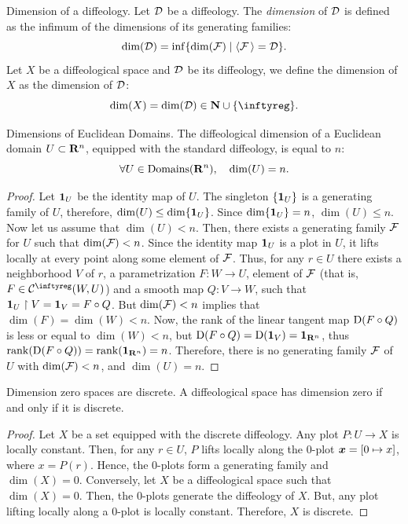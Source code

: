 \begin{Article}{Dimension of a diffeology.}{}
  Let $\mathcal{D}$ be a diffeology.
  The \emph{dimension} of $\mathcal{D}$ is defined as the infimum of the dimensions of its generating families:
  $$%
    \dim(\cD) = \inf \{ \dim(\cF) \mid  \langle \cF \,\rangle = \cD \}.
    $$%
  Let $X$ be a diffeological space and $\mathcal{D}$ be its diffeology,
  we define the dimension of $X$ as the dimension of $\mathcal{D}$:
  $$%
    \dim(X) = \dim(\cD) \in \NN \cup \{\infty\}.
    $$%
\end{Article}

\begin{Article}{Dimensions of Euclidean Domains.}{}
  \label{Dimensions-of-numerical-domains}
  The diffeological dimension of a Euclidean domain $U \subset \mathbf{R}^n$,
  equipped with the standard diffeology,
  is equal to $n$:
  $$%
    \forall U \in \Domains(\RR^n), \quad \dim(U) = n.
    $$%
\end{Article}

\begin{proof}
  Let ${\mathbf{1}}_U$ be the identity map of $U$.
  The singleton $\{{\mathbf{1}}_U\}$ is a generating family of $U$,
  therefore,
  $\dim(U) \leq \dim \{{\mathbf{1}}_U\}$.
  Since $\dim\{{\mathbf{1}}_U\} = n$,
  $\dim(U) \leq n$.
  Now let us assume that $\dim(U) < n$.
  Then,
  there exists a generating family $\mathcal{F}$ for $U$ such that $\dim(\mathcal{F}) < n$.
  Since the identity map ${\mathbf{1}}_U$ is a plot in $U$,
  it lifts locally at every point along some element of $\mathcal{F}$.
  Thus,
  for any $r \in U$ there exists a neighborhood $V$ of $r$,
  a parametrization $F \colon W \to U$,
  element of $\mathcal{F}$ (that is, $F \in \Cinfty(W,U)$) and a smooth map $Q \colon V \to W$,
  such that ${\mathbf{1}}_U \restriction V = {\mathbf{1}}_V = F \circ Q$.
  But $\dim(\mathcal{F}) < n$ implies that $\dim(F)= \dim(W) <n$.
  Now,
  the rank of the linear tangent map $\operatorname{D}(F \circ Q)$ is less or equal to $\dim(W) <n$,
  but $\operatorname{D}(F \circ Q) = \operatorname{D}({\mathbf{1}}_V) = {\mathbf{1}}_{\mathbf{R}^n}$,
  thus $\operatorname{rank}(\operatorname{D}(F \circ Q)) = \operatorname{rank}({\mathbf{1}}_{\mathbf{R}^n}) = n$.
  Therefore,
  there is no generating family $\mathcal{F}$ of $U$ with $\dim(\mathcal{F}) <n$,
  and $\dim(U) = n$.
\end{proof}

\begin{Article}{Dimension zero spaces are discrete.}
  A diffeological space has dimension zero if and only if it is discrete.
\end{Article}

\begin{proof} Let $X$ be a set equipped with the discrete diffeology.
  Any plot $P \colon U \to X$ is locally constant.
  Then,
  for any $r \in U$,
  $P$ lifts locally along the $0$-plot ${\boldsymbol x} = [0 \mapsto x]$,
  where $x = P(r)$.
  Hence,
  the $0$-plots form a generating family and $\dim(X) = 0$.
  Conversely,
  let $X$ be a diffeological space such that $\dim(X) = 0$.
  Then,
  the $0$-plots generate the diffeology of $X$.
  But,
  any plot lifting locally along a $0$-plot is locally constant.
  Therefore, $X$ is discrete.
\end{proof}

